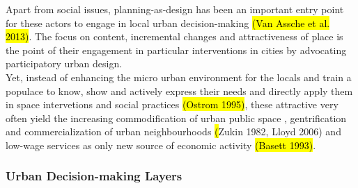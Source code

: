 \documentclass[11pt]{report}
\begin{document}
Apart from social issues, planning-as-design has been an important entry point for these actors to engage in local urban decision-making \hl{(Van Assche et al. 2013)}.
The focus on content, incremental changes  and attractiveness of place is the point of their engagement in particular interventions in cities by advocating participatory urban design.
\\
Yet, instead of enhancing the micro urban environment for the locals and train a populace to know, show and actively express their needs and directly apply them in space intervetions and social practices \hl{(Ostrom 1995)}, these attractive very often yield the increasing commodification of urban public space \cite{(Lehrer and Laidley 2008)}, gentrification and commercialization of urban neighbourhoods \hl(Zukin 1982, Lloyd 2006) and low-wage services as only new source of economic activity \hl{(Basett 1993)}.

\subsubsection{Urban Decision-making Layers}
\end{document}
